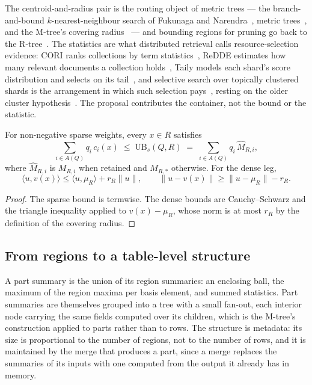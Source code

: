 The centroid-and-radius pair is the routing object of metric trees --- the
branch-and-bound $k$-nearest-neighbour search of Fukunaga and
Narendra~\cite{fukunaga1975branch}, metric trees~\cite{uhlmann1991metric}, and
the M-tree's covering radius~\cite{ciaccia1997mtree} --- and bounding regions
for pruning go back to the R-tree~\cite{guttman1984rtree}. The statistics are
what distributed retrieval calls resource-selection evidence: CORI ranks
collections by term statistics~\cite{callan1995cori}, ReDDE estimates how many
relevant documents a collection holds~\cite{si2003redde}, Taily models each
shard's score distribution and selects on its tail~\cite{aly2013taily}, and
selective search over topically clustered shards is the arrangement in
which such selection pays~\cite{kulkarni2015selective}, resting on the older
cluster hypothesis~\cite{vanrijsbergen1979ir}. The proposal contributes the
container, not the bound or the statistic.

\begin{proposition}
For non-negative sparse weights, every $x \in R$ satisfies
\[
  \sum_{i \in A(Q)} q_i\, c_i(x) \;\le\; \mathrm{UB}_s(Q,R)
  \;=\; \sum_{i \in A(Q)} q_i\, \widehat{M}_{R,i},
\]
where $\widehat{M}_{R,i}$ is $M_{R,i}$ when retained and $M_{R,\ast}$
otherwise. For the dense leg,
\[
  \langle u, v(x)\rangle \le \langle u, \mu_R\rangle + r_R \lVert u \rVert,
  \qquad
  \lVert u - v(x)\rVert \ge \lVert u - \mu_R \rVert - r_R .
\]
\end{proposition}
\begin{proof}
The sparse bound is termwise. The dense bounds are Cauchy--Schwarz and the
triangle inequality applied to $v(x) - \mu_R$, whose norm is at most $r_R$ by
the definition of the covering radius.
\end{proof}

\subsection{From regions to a table-level structure}

\proposed{} A part summary is the union of its region summaries: an enclosing
ball, the maximum of the region maxima per basis element, and summed
statistics. Part summaries are themselves grouped into a tree with a small
fan-out, each interior node carrying the same fields computed over its
children, which is the M-tree's construction applied to parts rather than to
rows. The structure is metadata: its size is proportional to the number of
regions, not to the number of rows, and it is maintained by the merge that
produces a part, since a merge replaces the summaries of its inputs with one
computed from the output it already has in memory.

